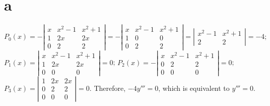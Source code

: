\documentclass[dvips]{book}
\numberwithin{example}{section}
\numberwithin{equation}{section}
\numberwithin{theorem}{section}
\numberwithin{table}{section}
\numberwithin{figure}{section}
\begin{document}
\part{a}
$$
P_0(x)=
-\left|\begin{array}{ccc}
x&x^2-1&x^2+1\\
1&2x&2x\\0&2&2
\end{array}\right|=
-\left|\begin{array}{ccc}
x&x^2-1&x^2+1\\
1&0&0\\0&2&2
\end{array}\right|=
\left|\begin{array}{cc}
x^2-1&x^2+1\\2&2
\end{array}\right|=-4;
$$
$P_1(x)=
\left|\begin{array}{ccc}x&x^2-1&x^2+1\\1&2x&2x\\0&0&0\end{array}\right|=0$;
$P_2(x)=-
\left|\begin{array}{ccc}x&x^2-1&x^2+1\\0&2&2\\0&0&0\end{array}\right|=0$;
$P_3(x)=
\left|\begin{array}{ccc}1&2x&2x\\0&2&2\\0&0&0\end{array}\right|=0$.
Therefore, $-4y'''=0$, which is equivalent
to $y'''=0$.
\end{document}
